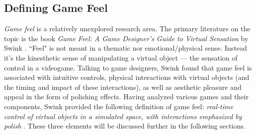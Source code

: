 \subsection{Defining Game Feel}
\textit{Game feel} is a relatively unexplored research area. The primary literature on the topic is the book \textit{Game Feel: A Game Designer's Guide to Virtual Sensation} by Swink \cite{swink}. ``Feel" is not meant in a thematic nor emotional/physical sense. Instead it's the kinesthetic sense of manipulating a virtual object --- the sensation of control in a videogame. Talking to game designers, Swink found that game feel is associated with intuitive controls, physical interactions with virtual objects (and the timing and impact of these interactions), as well as aesthetic pleasure and appeal in the form of polishing effects. Having analyzed various games and their components, Swink provided the following definition of game feel: \textit{real-time control of virtual objects in a simulated space, with interactions emphasized by polish} \cite{swink}. These three elements will be discussed further in the following sections.

